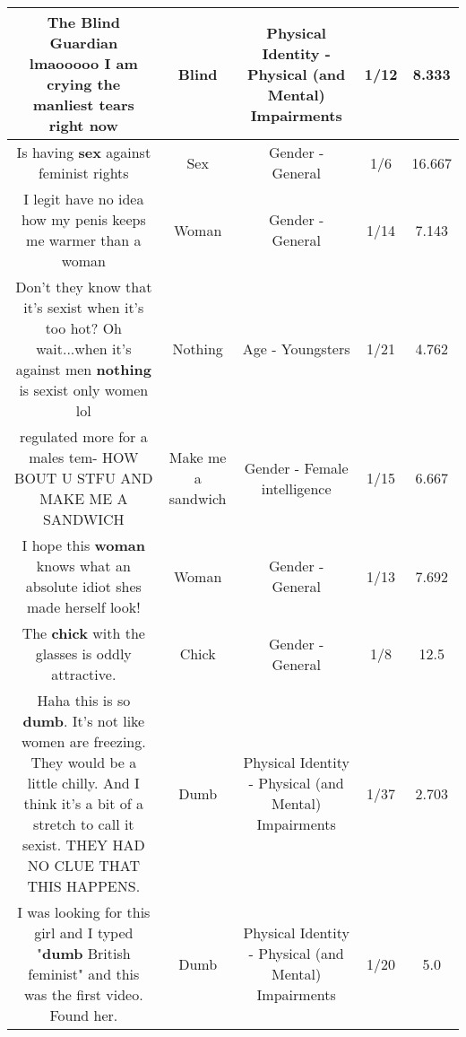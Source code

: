 \documentclass[11pt]{article}
\newlength\mylength
\begin{document}
\begin{center}
\begin{longtable}{|C{.65\mylength}|C{.30\mylength}|C{.12\mylength}|C{.12\mylength}|C{.12\mylength}|}
  \small The \textbf{Blind} Guardian lmaooooo I am crying the manliest tears right now\normalsize   & Blind & Physical Identity - Physical (and Mental) Impairments & 1/12 & 8.333 \\  \hline
  \small Is having \textbf{sex} against feminist rights\normalsize   & Sex & Gender - General & 1/6 & 16.667 \\  \hline
  \small I legit have no idea how my penis keeps me warmer than a woman\normalsize   & Woman & Gender - General & 1/14 & 7.143 \\  \hline
  \small Don't they know that it's sexist when it's too hot? Oh wait...when it's against men \textbf{nothing} is sexist only women lol\normalsize   & Nothing & Age - Youngsters & 1/21 & 4.762 \\  \hline
  \small regulated more for a males tem- HOW BOUT U STFU AND MAKE ME A SANDWICH\normalsize   & Make me a sandwich & Gender - Female intelligence & 1/15 & 6.667 \\  \hline
  \small I hope this \textbf{woman} knows what an absolute idiot shes made herself look!\normalsize   & Woman & Gender - General & 1/13 & 7.692 \\  \hline
  \small The \textbf{chick} with the glasses is oddly attractive.\normalsize   & Chick & Gender - General & 1/8 & 12.5 \\  \hline
  \small Haha this is so \textbf{dumb}. It's not like women are freezing. They would be a little chilly. And I think it's a bit of a stretch to call it sexist. THEY HAD NO CLUE THAT THIS HAPPENS.\normalsize   & Dumb & Physical Identity - Physical (and Mental) Impairments & 1/37 & 2.703 \\  \hline
  \small I was looking for this girl and I typed "\textbf{dumb} British feminist" and this was the first video. Found her.\normalsize   & Dumb & Physical Identity - Physical (and Mental) Impairments & 1/20 & 5.0 \\  \hline

\end{longtable}
\end{center}
\end{document}
